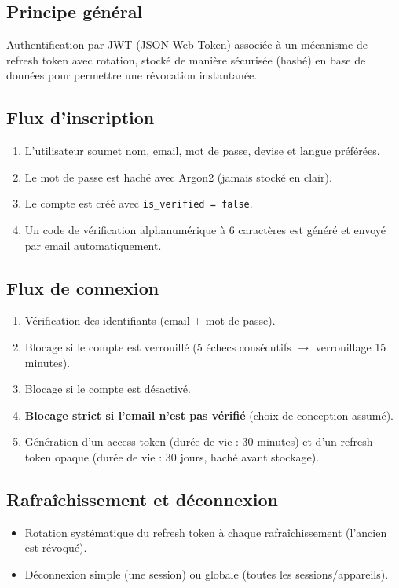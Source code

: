 \documentclass[11pt,a4paper]{article}
\begin{document}
\subsection{Principe général}
Authentification par JWT (JSON Web Token) associée à un mécanisme de refresh token avec rotation, stocké de manière sécurisée (hashé) en base de données pour permettre une révocation instantanée.

\subsection{Flux d'inscription}
\begin{enumerate}[leftmargin=*]
    \item L'utilisateur soumet nom, email, mot de passe, devise et langue préférées.
    \item Le mot de passe est haché avec Argon2 (jamais stocké en clair).
    \item Le compte est créé avec \texttt{is\_verified = false}.
    \item Un code de vérification alphanumérique à 6 caractères est généré et envoyé par email automatiquement.
\end{enumerate}

\subsection{Flux de connexion}
\begin{enumerate}[leftmargin=*]
    \item Vérification des identifiants (email + mot de passe).
    \item Blocage si le compte est verrouillé (5 échecs consécutifs $\rightarrow$ verrouillage 15 minutes).
    \item Blocage si le compte est désactivé.
    \item \textbf{Blocage strict si l'email n'est pas vérifié} (choix de conception assumé).
    \item Génération d'un access token (durée de vie : 30 minutes) et d'un refresh token opaque (durée de vie : 30 jours, haché avant stockage).
\end{enumerate}

\subsection{Rafraîchissement et déconnexion}
\begin{itemize}[leftmargin=*]
    \item Rotation systématique du refresh token à chaque rafraîchissement (l'ancien est révoqué).
    \item Déconnexion simple (une session) ou globale (toutes les sessions/appareils).
\end{itemize}
\end{document}
